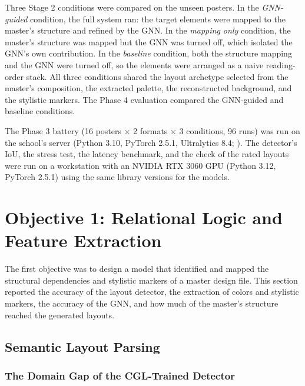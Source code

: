 \begin{refsection}
Three Stage 2 conditions were compared on the unseen posters. In the \textit{GNN-guided} condition, the full system ran: the target elements were mapped to the master's structure and refined by the GNN. In the \textit{mapping only} condition, the master's structure was mapped but the GNN was turned off, which isolated the GNN's own contribution. In the \textit{baseline} condition, both the structure mapping and the GNN were turned off, so the elements were arranged as a naive reading-order stack. All three conditions shared the layout archetype selected from the master's composition, the extracted palette, the reconstructed background, and the stylistic markers. The Phase 4 evaluation compared the GNN-guided and baseline conditions.

The Phase 3 battery (16 posters $\times$ 2 formats $\times$ 3 conditions, 96 runs) was run on the school's server (Python 3.10, PyTorch 2.5.1, Ultralytics 8.4; ). The detector's IoU, the stress test, the latency benchmark, and the check of the rated layouts were run on a workstation with an NVIDIA RTX 3060 GPU (Python 3.12, PyTorch 2.5.1) using the same library versions for the models.

\section{Objective 1: Relational Logic and Feature Extraction}

The first objective was to design a model that identified and mapped the structural dependencies and stylistic markers of a master design file. This section reported the accuracy of the layout detector, the extraction of colors and stylistic markers, the accuracy of the GNN, and how much of the master's structure reached the generated layouts.

\subsection{Semantic Layout Parsing}

\subsubsection{The Domain Gap of the CGL-Trained Detector}


\end{refsection}
